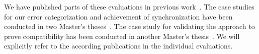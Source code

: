 

We have published parts of these evaluations in previous work~\cite{klare2019icmt,klare2020compatibility-report,gleitze2020orchestration}. The case studies for our error categorization and achievement of synchronization have been conducted in two Master's theses~\cite{syma2018ma,saglam2020ma}. The case study for validating the approach to prove compatibility has been conducted in another Master's thesis~\cite{pepin2019ma}. We will explicitly refer to the according publications in the individual evaluations.






